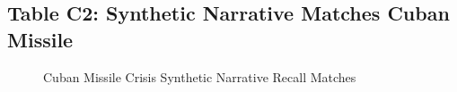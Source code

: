 \documentclass{article}
\begin{document}
\hypertarget{table-c2-synthetic-narrative-matches-cuban-missile}{%
\subsection{Table C2: Synthetic Narrative Matches Cuban
Missile}\label{table-c2-synthetic-narrative-matches-cuban-missile}}

\hphantom{em}

\begin{figure}[H]
\caption{ Cuban Missile Crisis Synthetic Narrative Recall Matches \label{fig:ft_cuba_recall}}
\end{figure}
\clearpage
\end{document}

